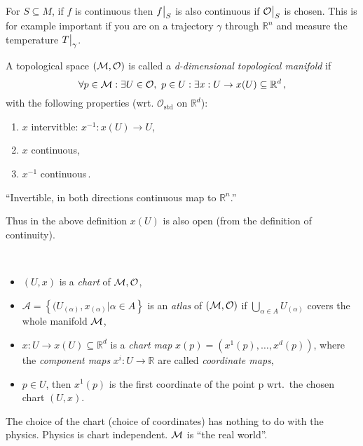\begin{note}
    For $S \subseteq M$, if $f$ is continuous then $f\big|_{S}$ is also
    continuous if $\mathcal{O}\big|_S$ is chosen. This is for example important
    if you are on a trajectory $\gamma$ through $\mathbb{R}^n$ and measure the temperature
    $T\big|_\gamma$.
\end{note}

\begin{defn}
    A topological space $(\mathcal{M}, \mathcal{O})$ is called a \textit{d-dimensional topological manifold}
    if
    \begin{equation}
        \forall p \in \mathcal{M}: \exists U \in \mathcal{O},~p\in U: \exists x: U\to x(U)\subseteq \mathbb{R}^{d}
        \,,
    \end{equation}
    with the following properties (wrt. $\mathcal O_\text{std}$ on $\mathbb{R}^{d}$):
    \begin{enumerate}
        \item $x$ intervitble: $x^{-1} : x(U) \to U$,
        \item $x$ continuous,
        \item $x^{-1}$ continuous\,.
    \end{enumerate}
    ``Invertible, in both directions continuous map to $\mathbb{R}^{n}$.''
\end{defn}

\begin{note}
    Thus in the above definition $x(U)$ is also open (from the definition of continuity).
\end{note}

\begin{terminology}~\\
    \begin{itemize}
        \item $(U,x)$ is a \textit{chart} of $\mathcal{M}, \mathcal{O}$,
        \item $\mathcal{A} = \left\{ (U_{(\alpha)}, x_{(\alpha)} | \alpha \in A \right\}$ is an \textit{atlas} of $(\mathcal{M}, \mathcal{O})$ if $\bigcup\limits_{\alpha\in A} U_{(\alpha)}$ covers the whole manifold $\mathcal{M}$,
        \item $x: U \to x(U) \subseteq \mathbb{R}^{d}$ is a \textit{chart map} 
            $x(p) = (x^1(p), \dots, x^d(p))$, where the \textit{component maps} $x^i: U\to\mathbb{R}$ are called \textit{coordinate maps},
        \item $p \in U$, then $x^1(p)$ is the first coordinate of the point p wrt.\ the chosen chart $(U, x)$.
    \end{itemize}
\end{terminology}
\begin{note}
    The choice of the chart (choice of coordinates) has nothing to do with the physics.
    Physics is chart independent. $\mathcal{M}$ is ``the real world''.
\end{note}

